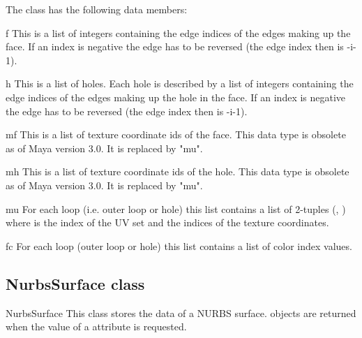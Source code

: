 The class has the following data members:

\begin{memberdesc}{f}
This is a list of integers containing the edge indices of the edges 
making up the face. If an index is negative the edge has to be
reversed (the edge index then is -i-1).
\end{memberdesc}

\begin{memberdesc}{h}
This is a list of holes. Each hole is described by a list of integers 
containing the edge indices of the edges 
making up the hole in the face. If an index is negative the edge has to be
reversed (the edge index then is -i-1).
\end{memberdesc}

\begin{memberdesc}{mf}
This is a list of texture coordinate ids of the face. This data type
is obsolete as of Maya version 3.0. It is replaced by "mu".
\end{memberdesc}

\begin{memberdesc}{mh}
This is a list of texture coordinate ids of the hole. This data type
is obsolete as of Maya version 3.0. It is replaced by "mu".
\end{memberdesc}

\begin{memberdesc}{mu}
For each loop (i.e. outer loop or hole) this list contains a list of
2-tuples (, ) where  is the index of
the UV set and  the indices of the texture coordinates.
\end{memberdesc}

\begin{memberdesc}{fc}
For each loop (outer loop or hole) this list contains a list of color 
index values.
\end{memberdesc}

\subsection{NurbsSurface class}
\label{nurbssurface}

\begin{classdesc*}{NurbsSurface}
This class stores the data of a NURBS surface.  objects
are returned when the value of a  attribute is requested.
\end{classdesc*}

